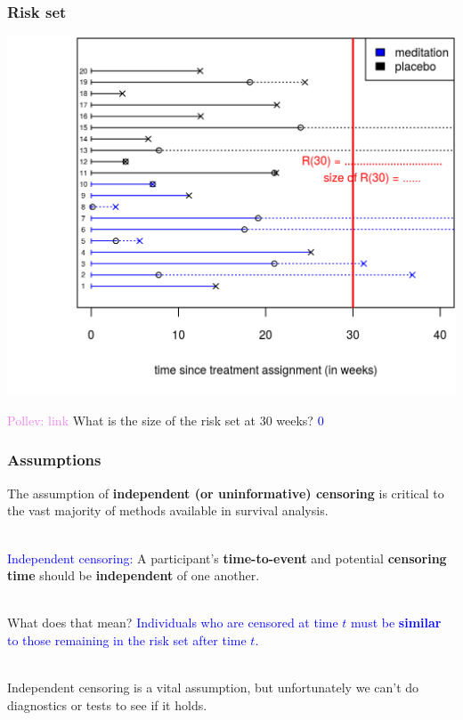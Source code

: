 \documentclass[10pt,t]{beamer}
\begin{document}
\begin{frame}
\frametitle{Risk set}
\begin{center}
\includegraphics[height=0.8\textheight]{figs/risk_set_movie_6.png}
\end{center}

\textcolor{violet}{Pollev: link} What is the size of the risk set at 30 weeks?  \pause\textcolor{blue}{0}
\end{frame}

\begin{frame}
\frametitle{Assumptions}
The assumption of \textbf{independent (or uninformative) censoring} is critical to the vast majority of methods available in survival analysis.
\\ ~\ 

\textcolor{blue}{Independent censoring:} A participant's \textbf{time-to-event} and potential \textbf{censoring time} should be \textbf{independent} of one another.  
\\ ~\ 

What does that mean?   \textcolor{blue}{Individuals who are censored at time $t$ must be \textbf{similar} to those remaining in the risk set after time $t$.}  
\\ ~\ 

Independent censoring is a vital assumption, but unfortunately we can't do diagnostics or tests to see if it holds. 

\end{frame}
\end{document}
